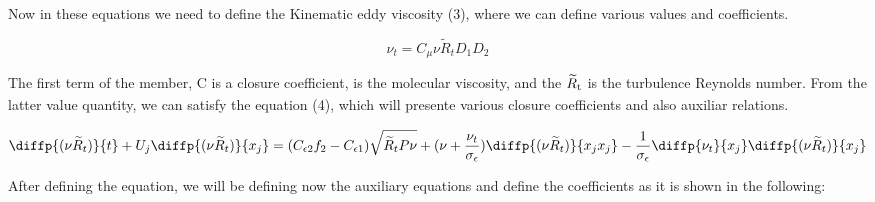 \documentclass{article}
\begin{document}
\newpage

Now in these equations we need to define the Kinematic eddy viscosity (3), where we can define various values and coefficients.

\begin{equation}
    \nu_t={C_\mu}{\nu}{\widetilde{R}_t}{D_1}{D_2}
\end{equation}

The first term of the member, C{\textsubscript{\textmugreek}} is a closure coefficient, {\textnu} is the molecular viscosity, and the ${\widetilde{R}\textsubscript{t}}$ is the turbulence Reynolds number. From the latter value quantity, we can satisfy the equation (4), which will presente various closure coefficients and also auxiliar relations.


\begin{equation}
\diffp{(\nu{\widetilde{R}_t})}{t}+{U_j}\diffp{(\nu{\widetilde{R}_t})}{{x_j}}=({C_{\epsilon2}}{f_2}-{C_{\epsilon1}})\sqrt{{\widetilde{R}_t}{P}{\nu}}+({\nu}+\frac{\nu_t}{\sigma_\epsilon})\diffp{(\nu{\widetilde{R}_t})}{{x_j}{x_j}}-{\frac{1}{\sigma_\epsilon}}{\diffp{\nu_t}{{x_j}}}{\diffp{(\nu\widetilde{R}_t)}{{x_j}}}
    \end{equation}
    
    After defining the equation, we will be defining now the auxiliary equations and define the coefficients as it is shown in the following:
\end{document}
